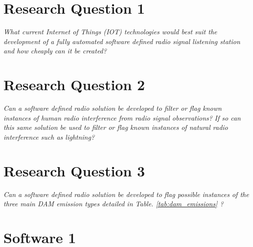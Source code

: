 \documentclass[runningheads,a4paper]{llncs}
\begin{document}




%
%
\newpage
\chapter*{Research Question 1}

\textit{What current Internet of Things (\gls{IOT}) technologies would best suit the development of a fully automated software defined radio signal listening station and how cheaply can it be created?}

%
%
\newpage
\chapter*{Research Question 2}

\textit{Can a software defined radio solution be developed to filter or flag known instances of human radio interference from radio signal observations?}
\textit{If so can this same solution be used to filter or flag known instances of natural radio interference such as lightning?}

%
%
\newpage
\chapter*{Research Question 3}

\textit{Can a software defined radio solution be developed to flag possible instances of the three main \gls{DAM} emission types detailed in Table. \ref{tab:dam_emissions} ?}

%
%
\newpage
\chapter*{Software 1}
\end{document}
